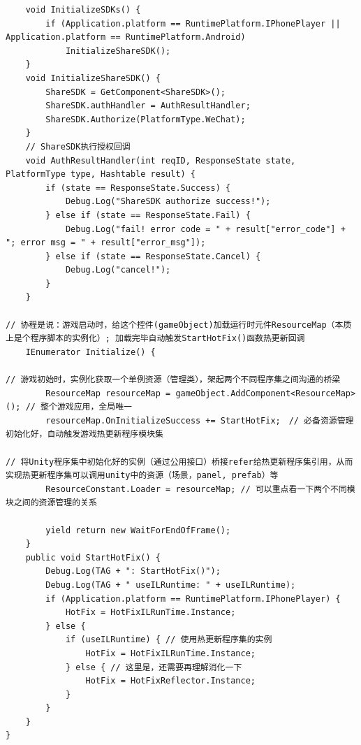 \documentclass[9pt, b5paper]{article}
\begin{document}
\begin{verbatim}
    void InitializeSDKs() {
        if (Application.platform == RuntimePlatform.IPhonePlayer || Application.platform == RuntimePlatform.Android) 
            InitializeShareSDK();
    }
    void InitializeShareSDK() {
        ShareSDK = GetComponent<ShareSDK>();
        ShareSDK.authHandler = AuthResultHandler;
        ShareSDK.Authorize(PlatformType.WeChat);
    }
    // ShareSDK执行授权回调
    void AuthResultHandler(int reqID, ResponseState state, PlatformType type, Hashtable result) {
        if (state == ResponseState.Success) {
            Debug.Log("ShareSDK authorize success!");
        } else if (state == ResponseState.Fail) {
            Debug.Log("fail! error code = " + result["error_code"] + "; error msg = " + result["error_msg"]);
        } else if (state == ResponseState.Cancel) {
            Debug.Log("cancel!");
        }
    }

// 协程是说：游戏启动时，给这个控件(gameObject)加载运行时元件ResourceMap（本质上是个程序脚本的实例化）; 加载完毕自动触发StartHotFix()函数热更新回调
    IEnumerator Initialize() { 

// 游戏初始时，实例化获取一个单例资源（管理类），架起两个不同程序集之间沟通的桥梁
        ResourceMap resourceMap = gameObject.AddComponent<ResourceMap>(); // 整个游戏应用，全局唯一
        resourceMap.OnInitializeSuccess += StartHotFix;　// 必备资源管理初始化好，自动触发游戏热更新程序模块集

// 将Unity程序集中初始化好的实例（通过公用接口）桥接refer给热更新程序集引用，从而实现热更新程序集可以调用unity中的资源（场景，panel, prefab）等
        ResourceConstant.Loader = resourceMap; // 可以重点看一下两个不同模块之间的资源管理的关系

        yield return new WaitForEndOfFrame();
    }
    public void StartHotFix() {
        Debug.Log(TAG + ": StartHotFix()");
        Debug.Log(TAG + " useILRuntime: " + useILRuntime); 
        if (Application.platform == RuntimePlatform.IPhonePlayer) {
            HotFix = HotFixILRunTime.Instance;
        } else {
            if (useILRuntime) { // 使用热更新程序集的实例
                HotFix = HotFixILRunTime.Instance;
            } else { // 这里是，还需要再理解消化一下
                HotFix = HotFixReflector.Instance;
            }
        }
    }
}
\end{verbatim}
\end{document}
